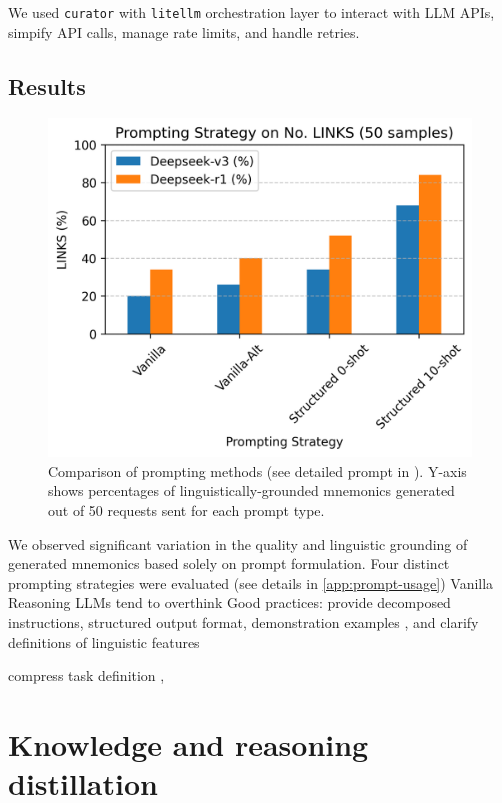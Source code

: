 \documentclass[11pt]{article}
\begin{document}
We used \verb|curator| \citep{BespokeLabBESPOKE2025} with \verb|litellm| orchestration layer to interact with LLM APIs, simpify API calls, manage rate limits, and handle retries.

\subsection{Results}

\begin{figure}
  \centering
  \includegraphics[width=\linewidth]{figures/prompt_comparison.png}
  \caption{Comparison of prompting methods (see detailed prompt in ). Y-axis shows percentages of linguistically-grounded mnemonics generated out of 50 requests sent for each prompt type.}
  \label{fig:prompting-methods}
\end{figure}

We observed significant variation in the quality and linguistic grounding of generated mnemonics based solely on prompt formulation. Four distinct prompting strategies were evaluated (see details in \cref{app:prompt-usage})
Vanilla
Reasoning LLMs tend to overthink \citep{xuChainDraftThinking2025}
Good practices: provide decomposed instructions, structured output format, demonstration examples \citep{MishraREFRAMING2022}, and clarify definitions of linguistic features \citep{yinDidYouRead2023}

compress task definition \citep{yinDidYouRead2023},


\section{Knowledge and reasoning distillation} \label{sec:distillation}
\end{document}
